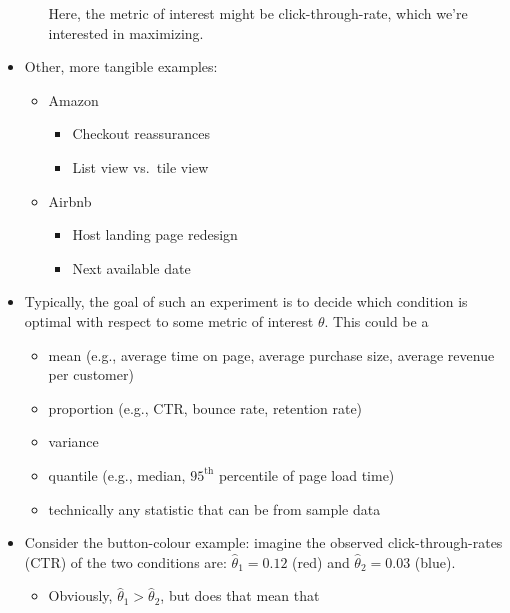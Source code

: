 \begin{itemize}
\begin{itemize}
                        Here, the metric of interest might be click-through-rate, which
                        we're interested in maximizing.
            \end{itemize}
      \item Other, more tangible examples:
            \begin{itemize}
                  \item Amazon
                        \begin{itemize}
                              \item Checkout reassurances
                              \item List view vs.\ tile view
                        \end{itemize}
                  \item Airbnb
                        \begin{itemize}
                              \item Host landing page redesign
                              \item Next available date
                        \end{itemize}
            \end{itemize}
      \item Typically, the goal of such an experiment is to decide which condition is optimal
            with respect to some metric of interest $ \theta $. This could be a
            \begin{itemize}
                  \item mean (e.g., average time on page, average purchase size, average revenue per customer)
                  \item proportion (e.g., CTR, bounce rate, retention rate)
                  \item variance
                  \item quantile (e.g., median, $ 95^{\text{th}} $ percentile of page load time)
                  \item technically any statistic that can be from sample data
            \end{itemize}
      \item Consider the button-colour example: imagine the observed click-through-rates (CTR) of the two
            conditions are: $ \hat{\theta}_1=0.12 $ (red) and $ \hat{\theta}_2=0.03 $ (blue).
            \begin{itemize}
                  \item Obviously, $ \hat{\theta}_1>\hat{\theta}_2 $, but does that mean that

\end{itemize}
\end{itemize}
